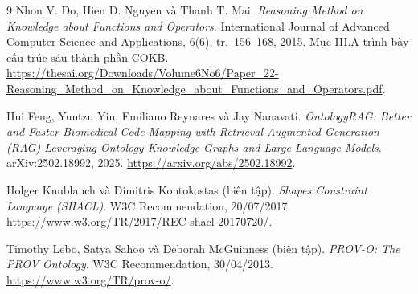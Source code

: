 \begin{thebibliography}{9}
Nhon V. Do, Hien D. Nguyen và Thanh T. Mai.
\emph{Reasoning Method on Knowledge about Functions and Operators}.
International Journal of Advanced Computer Science and Applications,
6(6), tr.~156--168, 2015. Mục III.A trình bày cấu trúc sáu thành phần COKB.
\url{https://thesai.org/Downloads/Volume6No6/Paper_22-Reasoning_Method_on_Knowledge_about_Functions_and_Operators.pdf}.

Hui Feng, Yuntzu Yin, Emiliano Reynares và Jay Nanavati.
\emph{OntologyRAG: Better and Faster Biomedical Code Mapping with
Retrieval-Augmented Generation (RAG) Leveraging Ontology Knowledge Graphs
and Large Language Models}. arXiv:2502.18992, 2025.
\url{https://arxiv.org/abs/2502.18992}.

Holger Knublauch và Dimitris Kontokostas (biên tập).
\emph{Shapes Constraint Language (SHACL)}.
W3C Recommendation, 20/07/2017.
\url{https://www.w3.org/TR/2017/REC-shacl-20170720/}.

Timothy Lebo, Satya Sahoo và Deborah McGuinness (biên tập).
\emph{PROV-O: The PROV Ontology}.
W3C Recommendation, 30/04/2013.
\url{https://www.w3.org/TR/prov-o/}.
\end{thebibliography}
